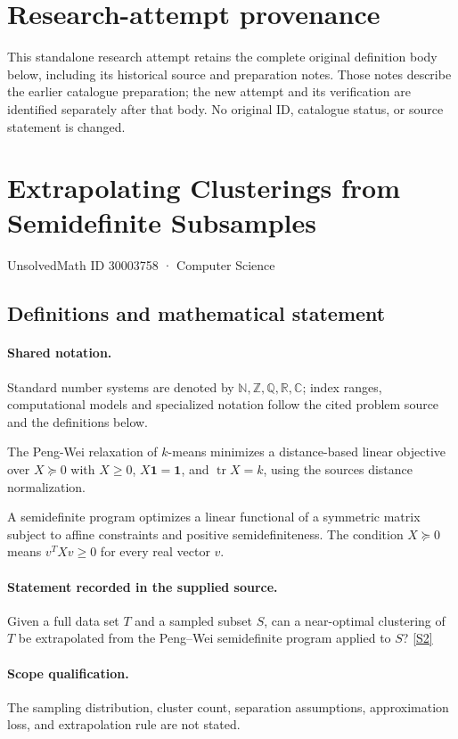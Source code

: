 \documentclass[11pt]{article}
\begin{document}
\section*{Research-attempt provenance}
This standalone research attempt retains the complete original definition body below,
including its historical source and preparation notes. Those notes describe the
earlier catalogue preparation; the new attempt and its verification are identified
separately after that body. No original ID, catalogue status, or source statement is changed.

\section{Extrapolating Clusterings from Semidefinite Subsamples}\label{30003758}
{\small UnsolvedMath ID 30003758 · Computer Science}
\subsection{Definitions and mathematical statement}

\paragraph{Shared notation.}Standard number systems are denoted by $\mathbb N,\mathbb Z,\mathbb Q,\mathbb R,\mathbb C$; index ranges, computational models and specialized notation follow the cited problem source and the definitions below.


The Peng-Wei relaxation of $k$-means minimizes a distance-based linear objective over $X\succeq0$ with $X\geq0$, $X\mathbf1=\mathbf1$, and $\operatorname{tr}X=k$, using the source\textquotesingle s distance normalization.

A semidefinite program optimizes a linear functional of a symmetric matrix subject to affine constraints and positive semidefiniteness. The condition $X\succeq0$ means $v^TXv\geq0$ for every real vector $v$.
\paragraph{Statement recorded in the supplied source.}
Given a full data set $T$ and a sampled subset $S$, can a near-optimal clustering of $T$ be extrapolated from the Peng–Wei semidefinite program applied to $S$? \href{https://doi.org/10.4171/owr/2018/14}{[S2]}
\paragraph{Scope qualification.}
The sampling distribution, cluster count, separation assumptions, approximation loss, and extrapolation rule are not stated.
\end{document}
